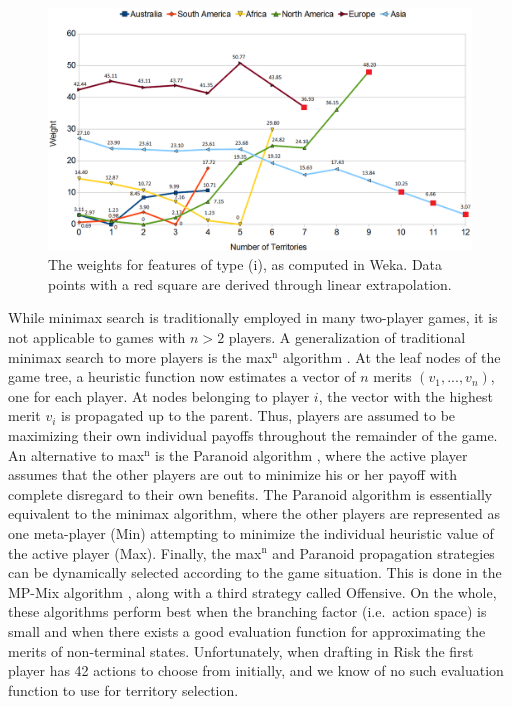 \documentclass[letterpaper]{article}
\numberwithin{equation}{section}
\numberwithin{theorem}{section}
\numberwithin{lemma}{section}
\numberwithin{df}{section}
\begin{document}

\begin{figure}[t]
	\centering
	\includegraphics[scale=0.57]{TerritoryValues2.png}
	\caption{The weights for features of type (i), as computed in Weka.  Data points with a red square are derived through linear extrapolation.}
	\label{fig:TerritoryValues2}
\end{figure} 

While minimax search is traditionally employed in many two-player games, it is not applicable to games with $n > 2$ players.  A generalization of traditional minimax search to more players is the max$^\text{n}$ algorithm \cite{MaxN}.  At the leaf nodes of the game tree, a heuristic function now estimates a vector of $n$ merits $(v_1, ..., v_n)$, one for each player.  At nodes belonging to player $i$, the vector with the highest merit $v_i$ is propagated up to the parent.  Thus, players are assumed to be maximizing their own individual payoffs throughout the remainder of the game.  An alternative to max$^\text{n}$ is the Paranoid algorithm \cite{Paranoid}, where the active player assumes that the other players are out to minimize his or her payoff with complete disregard to their own benefits.  The Paranoid algorithm is essentially equivalent to the minimax algorithm, where the other players are represented as one meta-player (Min) attempting to minimize the individual heuristic value of the active player (Max).  Finally, the max$^\text{n}$ and Paranoid propagation strategies can be dynamically selected according to the game situation.  This is done in the MP-Mix algorithm \cite{ZuckFelnerKraus2009}, along with a third strategy called Offensive.  On the whole, these algorithms perform best when the branching factor (i.e.~action space) is small and when there exists a good evaluation function for approximating the merits of non-terminal states.  Unfortunately, when drafting in Risk the first player has 42 actions to choose from initially, and we know of no such evaluation function to use for territory selection.
\end{document}
